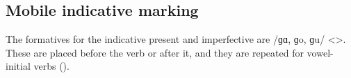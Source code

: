 \begin{table}[H] \centering
	\caption{Instrumental marking in the Arapgir dialect}
	\label{tab:Arapgir:morpho:noun:inst}
\end{table}

\subsection{Mobile indicative marking}


The formatives for the indicative present and imperfective are /ɡɑ, ɡo, ɡu/ <>. These are placed before the verb or after it, and they are repeated for vowel-initial verbs ().


